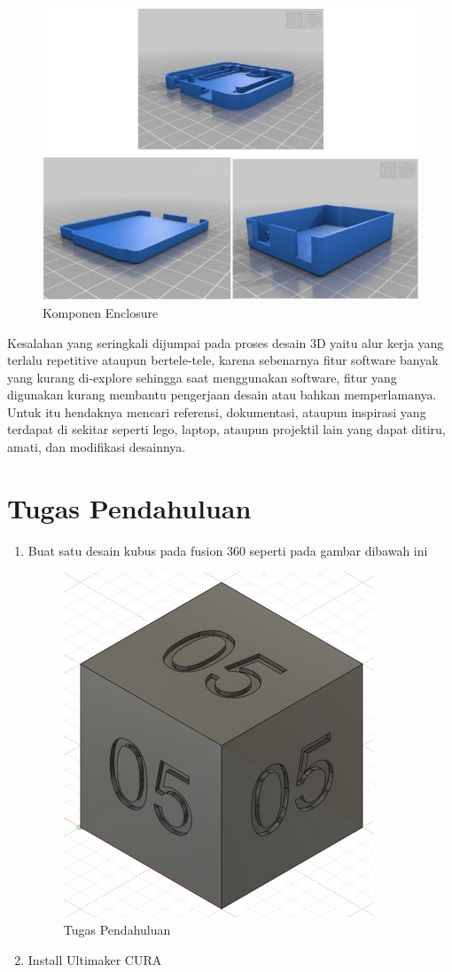 \begin{figure}[H]
    \centering
    \includegraphics[width=1\linewidth]{P3/img/image2.jpg}
    \caption{Komponen Enclosure}
    \label{fig:Komponen Enclosure}
\end{figure}

Kesalahan yang seringkali dijumpai pada proses desain 3D yaitu alur kerja yang terlalu repetitive ataupun
bertele-tele, karena sebenarnya fitur software banyak yang kurang di-explore sehingga saat
menggunakan software, fitur yang digunakan kurang membantu pengerjaan desain atau bahkan
memperlamanya. Untuk itu hendaknya mencari referensi, dokumentasi, ataupun inspirasi yang terdapat
di sekitar seperti lego, laptop, ataupun projektil lain yang dapat ditiru, amati, dan modifikasi desainnya.

\section{Tugas Pendahuluan}
\begin{enumerate}
    \item Buat satu desain kubus pada fusion 360 seperti pada gambar dibawah ini
        \begin{figure}[H]
            \centering
            \includegraphics[width=0.25\linewidth]{P3/img/soal1.png}
            \caption{Tugas Pendahuluan}
            \label{fig:Tugas Pendahuluan}
        \end{figure}
    \item Install Ultimaker CURA
\end{enumerate}

